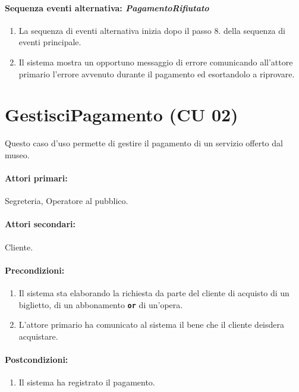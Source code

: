 \documentclass{article}
\begin{document}
	\paragraph{Sequenza eventi alternativa: \emph{PagamentoRifiutato}}
		\begin{enumerate}[itemsep=8pt,parsep=0pt]
				\item La sequenza di eventi alternativa inizia dopo il passo 8. della sequenza di eventi principale.
				\item Il sistema mostra un opportuno messaggio di errore comunicando all'attore primario l'errore avvenuto durante il pagamento ed esortandolo a riprovare.
		\end{enumerate}











\section*{GestisciPagamento (CU 02)}

    \indent\indent Questo caso d'uso permette di gestire il pagamento di un servizio offerto dal museo.
    
    \paragraph{Attori primari:}Segreteria, Operatore al pubblico.
	
	\paragraph{Attori secondari:}Cliente.
	
	\paragraph{Precondizioni:}
	\begin{enumerate}[itemsep=8pt,parsep=0pt]
		\item Il sistema sta elaborando la richiesta da parte del cliente di acquisto di un biglietto, di un abbonamento \texttt{\textbf{or}} di un'opera.
		\item L'attore primario ha comunicato al sistema il bene che il cliente deisdera acquistare.
	\end{enumerate}
	
	\paragraph{Postcondizioni:}
		\begin{enumerate}[itemsep=8pt,parsep=0pt]
			\item Il sistema ha registrato il pagamento.
		\end{enumerate}
	
\end{document}
